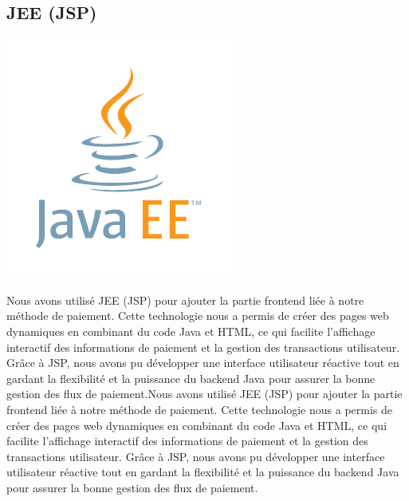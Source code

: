 \subsection*{JEE (JSP)}
\begin{center}
    \centering
    \includegraphics[scale=0.5]{Figures/jee.png}
    \label{fig:processus}
\end{center} 
Nous avons utilisé JEE (JSP) pour ajouter la partie frontend liée à notre méthode de paiement. Cette technologie nous a permis de créer des pages web dynamiques en combinant du code Java et HTML, ce qui facilite l'affichage interactif des informations de paiement et la gestion des transactions utilisateur. Grâce à JSP, nous avons pu développer une interface utilisateur réactive tout en gardant la flexibilité et la puissance du backend Java pour assurer la bonne gestion des flux de paiement.Nous avons utilisé JEE (JSP) pour ajouter la partie frontend liée à notre méthode de paiement. Cette technologie nous a permis de créer des pages web dynamiques en combinant du code Java et HTML, ce qui facilite l'affichage interactif des informations de paiement et la gestion des transactions utilisateur. Grâce à JSP, nous avons pu développer une interface utilisateur réactive tout en gardant la flexibilité et la puissance du backend Java pour assurer la bonne gestion des flux de paiement.

